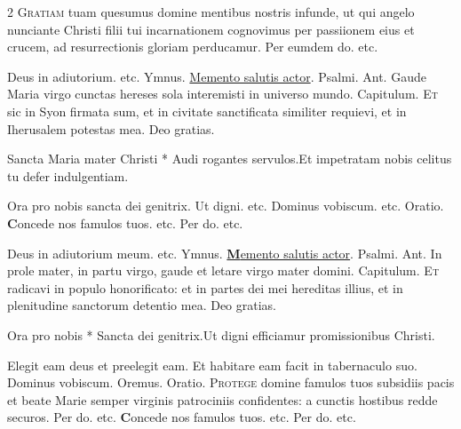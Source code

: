\begin{multicols*}{2}
\lettrine[lines=2]{\zallmancaps \color{Red} G}{ratiam} tuam quesumus domine mentibus nostris infunde, ut qui angelo nunciante Christi filii tui incarnationem cognovimus per passiionem eius et crucem, ad resurrectionis gloriam perducamur. Per eumdem do. etc.
{\color{Red} }
\par \noindent Deus in adiutorium. etc. {\color{Red} Ymnus.} \hyperlink{memento-salutis}{Memento salutis actor}. {\color{Red} Psalmi.}
{\color{Red} Ant.} Gaude Maria virgo cunctas hereses sola interemisti in universo mundo. {\color{Red} Capitulum.}
\lettrine[lines=2]{\zallmancaps \color{Blue} E}{t} sic in Syon firmata sum, et in civitate sanctificata similiter requievi, et in Iherusalem potestas mea. Deo gratias.
\begin{responsory-breve}
{Sancta Maria mater Christi * Audi rogantes servulos.}{Et impetratam nobis celitus tu defer indulgentiam.}
\end{responsory-breve}%
\V Ora pro nobis sancta dei genitrix. \R Ut digni. etc. Dominus vobiscum. etc. {\color{Red} Oratio.}
{\bfseries \color{Red} C}{oncede} nos famulos tuos. etc. Per do. etc.
{\color{Red} }
\par \noindent Deus in adiutorium meum. etc. {\color{Red} Ymnus.} \hyperlink{memento-salutis}{{\bfseries \color{Red} M}emento salutis actor}. {\color{Red} Psalmi.}
{\color{Red} Ant.} In prole mater, in partu virgo, gaude et letare virgo mater domini. {\color{Red} Capitulum.}
\lettrine[lines=2]{\zallmancaps \color{Red} E}{t} radicavi in populo honorificato: et in partes dei mei hereditas illius, et in plenitudine sanctorum detentio mea. Deo gratias.
\begin{responsory-breve}
{Ora pro nobis * Sancta dei genitrix.}{Ut digni efficiamur promissionibus Christi.}
\end{responsory-breve}%
\V Elegit eam deus et preelegit eam. \R Et habitare eam facit in tabernaculo suo. Dominus vobiscum. Oremus. {\color{Red} Oratio.}
\lettrine[lines=2]{\zallmancaps \color{Blue} P}{rotege} domine famulos tuos subsidiis pacis et beate Marie semper virginis patrociniis confidentes: a cunctis hostibus redde securos. Per do. etc.
{\bfseries \color{Red} C}{oncede} nos famulos tuos. etc. Per do. etc.
{\color{Red} }

\end{multicols*}
